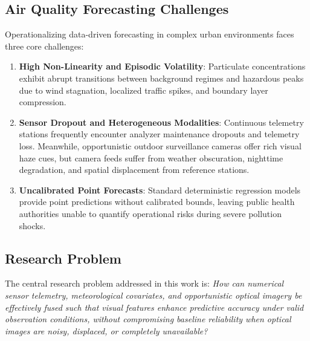 \documentclass[conference]{IEEEtran}
\begin{document}
\subsection{Air Quality Forecasting Challenges}
Operationalizing data-driven forecasting in complex urban environments faces three core challenges:
\begin{enumerate}
    \item \textbf{High Non-Linearity and Episodic Volatility}: Particulate concentrations exhibit abrupt transitions between background regimes and hazardous peaks due to wind stagnation, localized traffic spikes, and boundary layer compression.
    \item \textbf{Sensor Dropout and Heterogeneous Modalities}: Continuous telemetry stations frequently encounter analyzer maintenance dropouts and telemetry loss. Meanwhile, opportunistic outdoor surveillance cameras offer rich visual haze cues, but camera feeds suffer from weather obscuration, nighttime degradation, and spatial displacement from reference stations.
    \item \textbf{Uncalibrated Point Forecasts}: Standard deterministic regression models provide point predictions without calibrated bounds, leaving public health authorities unable to quantify operational risks during severe pollution shocks.
\end{enumerate}

\subsection{Research Problem}
The central research problem addressed in this work is: \textit{How can numerical sensor telemetry, meteorological covariates, and opportunistic optical imagery be effectively fused such that visual features enhance predictive accuracy under valid observation conditions, without compromising baseline reliability when optical images are noisy, displaced, or completely unavailable?}
\end{document}
